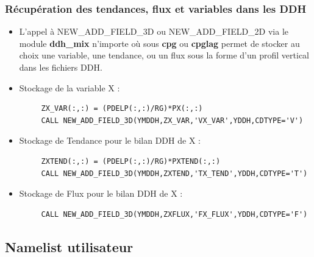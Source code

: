 \documentclass[aspectratio=169]{beamer}
\begin{document}
\begin{frame}[fragile]
\frametitle{\normalsize Récupération des tendances, flux et variables dans les DDH}
\vspace{-0.25cm}
\begin{alertblock}{} 
\footnotesize
\begin{itemize}
\item L'appel à NEW\_ADD\_FIELD\_3D ou NEW\_ADD\_FIELD\_2D via le module \textbf{ddh\_mix} 
n'importe où sous \textbf{cpg} ou \textbf{cpglag} permet de stocker au choix 
une variable, une tendance, ou un flux sous la forme d'un profil vertical 
dans les fichiers DDH.  
\end{itemize}
\end{alertblock}

\begin{exampleblock}{} 
\begin{footnotesize}
\begin{itemize}
\item Stockage de la variable X :
\begin{verbatim}
     ZX_VAR(:,:) = (PDELP(:,:)/RG)*PX(:,:)  
     CALL NEW_ADD_FIELD_3D(YMDDH,ZX_VAR,'VX_VAR',YDDH,CDTYPE='V')
\end{verbatim}
\item Stockage de Tendance pour le bilan DDH de X :
\begin{verbatim}
     ZXTEND(:,:) = (PDELP(:,:)/RG)*PXTEND(:,:)
     CALL NEW_ADD_FIELD_3D(YMDDH,ZXTEND,'TX_TEND',YDDH,CDTYPE='T')
\end{verbatim}
 \item Stockage de Flux pour le bilan DDH de X :
\begin{verbatim}
     CALL NEW_ADD_FIELD_3D(YMDDH,ZXFLUX,'FX_FLUX',YDDH,CDTYPE='F')
\end{verbatim}
\end{itemize}
\end{footnotesize}

\end{exampleblock}

\end{frame}
\subsection{Namelist utilisateur}
\end{document}
